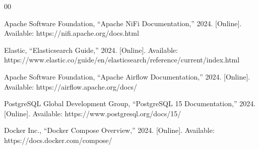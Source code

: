 \documentclass[conference]{IEEEtran}
\begin{document}
\begin{thebibliography}{00}

Apache Software Foundation, ``Apache NiFi Documentation,'' 2024. [Online]. Available: https://nifi.apache.org/docs.html

Elastic, ``Elasticsearch Guide,'' 2024. [Online]. Available: https://www.elastic.co/guide/en/elasticsearch/reference/current/index.html

Apache Software Foundation, ``Apache Airflow Documentation,'' 2024. [Online]. Available: https://airflow.apache.org/docs/

PostgreSQL Global Development Group, ``PostgreSQL 15 Documentation,'' 2024. [Online]. Available: https://www.postgresql.org/docs/15/

Docker Inc., ``Docker Compose Overview,'' 2024. [Online]. Available: https://docs.docker.com/compose/

\end{thebibliography}

    
\end{document}
